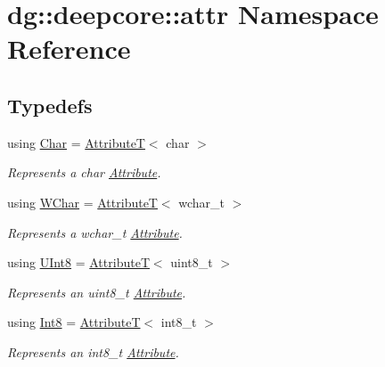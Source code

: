 \hypertarget{namespacedg_1_1deepcore_1_1attr}{}\section{dg\+:\+:deepcore\+:\+:attr Namespace Reference}
\label{namespacedg_1_1deepcore_1_1attr}
\subsection*{Typedefs}
\begin{DoxyCompactItemize}
\item 
using \hyperlink{group___process_attributes_gadac20aec5181f1e94408c0a195f5515a}{Char} = \hyperlink{structdg_1_1deepcore_1_1_attribute_t}{AttributeT}$<$ char $>$
\begin{DoxyCompactList}\small\item\em Represents a {\ttfamily char} \hyperlink{classdg_1_1deepcore_1_1_attribute}{Attribute}. \end{DoxyCompactList}\item 
using \hyperlink{group___process_attributes_gaae8956988d8184c8612522c0f7bf95f3}{W\+Char} = \hyperlink{structdg_1_1deepcore_1_1_attribute_t}{AttributeT}$<$ wchar\+\_\+t $>$
\begin{DoxyCompactList}\small\item\em Represents a {\ttfamily wchar\+\_\+t} \hyperlink{classdg_1_1deepcore_1_1_attribute}{Attribute}. \end{DoxyCompactList}\item 
using \hyperlink{group___process_attributes_ga9ee0103d6f3e94f58f86fb9b7c17ef4d}{U\+Int8} = \hyperlink{structdg_1_1deepcore_1_1_attribute_t}{AttributeT}$<$ uint8\+\_\+t $>$
\begin{DoxyCompactList}\small\item\em Represents an {\ttfamily uint8\+\_\+t} \hyperlink{classdg_1_1deepcore_1_1_attribute}{Attribute}. \end{DoxyCompactList}\item 
using \hyperlink{group___process_attributes_ga2024098683e1d9f9139de3e51952ea59}{Int8} = \hyperlink{structdg_1_1deepcore_1_1_attribute_t}{AttributeT}$<$ int8\+\_\+t $>$
\begin{DoxyCompactList}\small\item\em Represents an {\ttfamily int8\+\_\+t} \hyperlink{classdg_1_1deepcore_1_1_attribute}{Attribute}. \end{DoxyCompactList}\item 

\end{DoxyCompactItemize}
